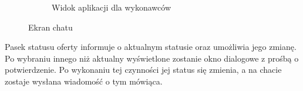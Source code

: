 \begin{figure}[ht]
\begin{subfigure}[t]{0.32\textwidth}
    \centering
    \caption{Widok aplikacji dla wykonawców}
  \end{subfigure}
  \caption{Ekran chatu}
  \label{fig:chat}
\end{figure}

Pasek statusu oferty informuje o aktualnym statusie oraz umożliwia jego zmianę. Po wybraniu innego niż aktualny wyświetlone zostanie okno dialogowe z prośbą o potwierdzenie. Po wykonaniu tej czynności jej status się zmienia, a na chacie zostaje wysłana wiadomość o tym mówiąca.

